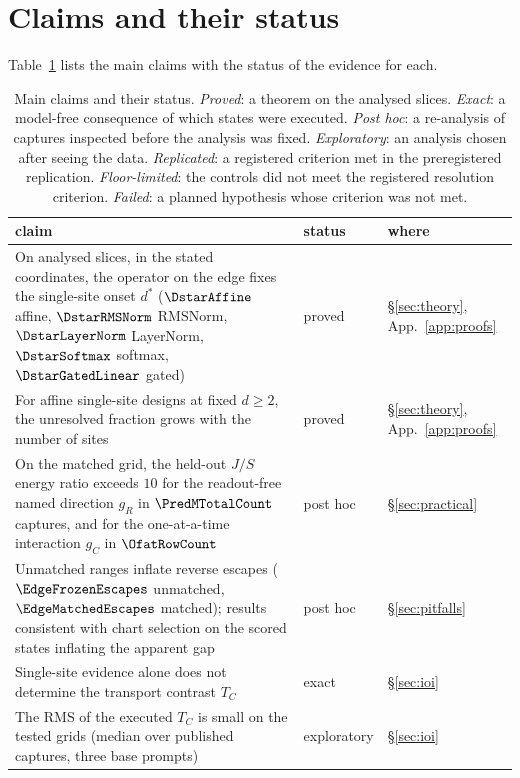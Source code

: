 \section{Claims and their status}
\label{app:status}

Table~\ref{tab:status} lists the main claims with the status of the evidence for each.

\begin{table}[h]
\centering\footnotesize
\caption{Main claims and their status. \emph{Proved}: a theorem on the analysed slices. \emph{Exact}: a model-free
consequence of which states were executed. \emph{Post hoc}: a re-analysis of captures inspected before the analysis was
fixed. \emph{Exploratory}: an analysis chosen after seeing the data. \emph{Replicated}: a registered criterion met in
the preregistered replication. \emph{Floor-limited}: the controls did not meet the registered resolution criterion.
\emph{Failed}: a planned hypothesis whose criterion was not met.}
\label{tab:status}
\begin{tabularx}{\textwidth}{@{}>{\raggedright\arraybackslash}X >{\raggedright\arraybackslash}p{} l@{}}
\toprule
claim & status & where \\
\midrule
On analysed slices, in the stated coordinates, the operator on the edge fixes the single-site onset $d^*$ ($\DstarAffine$ affine, $\DstarRMSNorm$ RMSNorm, $\DstarLayerNorm$ LayerNorm, $\DstarSoftmax$ softmax, $\DstarGatedLinear$ gated) & proved & \S\ref{sec:theory}, App.~\ref{app:proofs} \\
For affine single-site designs at fixed $d\ge2$, the unresolved fraction grows with the number of sites & proved & \S\ref{sec:theory}, App.~\ref{app:proofs} \\
\midrule
On the matched grid, the held-out $J/S$ energy ratio exceeds $10$ for the readout-free named direction $g_R$ in $\PredMTotalCount$ captures, and for the one-at-a-time interaction $g_C$ in $\OfatRowCount$ & post hoc & \S\ref{sec:practical} \\
Unmatched ranges inflate reverse escapes ($\EdgeFrozenEscapes$ unmatched, $\EdgeMatchedEscapes$ matched); results consistent with chart selection on the scored states inflating the apparent gap & post hoc & \S\ref{sec:pitfalls} \\
\midrule
Single-site evidence alone does not determine the transport contrast $T_C$ & exact & \S\ref{sec:ioi} \\
The RMS of the executed $T_C$ is small on the tested grids (median over published captures, three base prompts) & exploratory & \S\ref{sec:ioi} \\

\end{tabularx}
\end{table}
